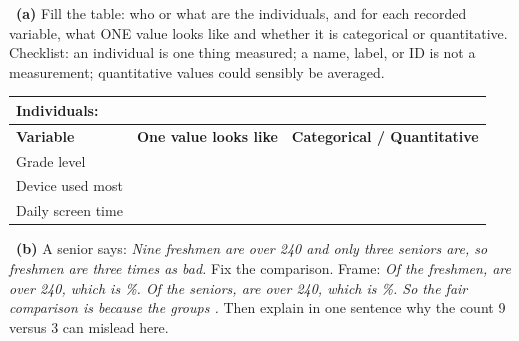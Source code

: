 \documentclass[11pt]{article}
\begin{document}
~\textbf{(a)} Fill the table: who or what are the individuals, and for each recorded variable, what ONE value looks like and whether it is categorical or quantitative. Checklist: an individual is one thing measured; a name, label, or ID is not a measurement; quantitative values could sensibly be averaged.\par\smallskip \begin{tabular}{|p{1.3in}|p{2.2in}|p{1.6in}|}\hline \textbf{Individuals:} & \multicolumn{2}{l|}{\hrulefill} \\ \hline \textbf{Variable} & \textbf{One value looks like} & \textbf{Categorical / Quantitative} \\ \hline Grade level & & \\[10pt] \hline Device used most & & \\[10pt] \hline Daily screen time & & \\[10pt] \hline \end{tabular}\par
{}

~\textbf{(b)} A senior says: \emph{Nine freshmen are over 240 and only three seniors are, so freshmen are three times as bad.} Fix the comparison. Frame: \emph{Of the \underline{\hspace{0.4in}} freshmen, \underline{\hspace{0.4in}} are over 240, which is \underline{\hspace{0.4in}}\%. Of the \underline{\hspace{0.4in}} seniors, \underline{\hspace{0.4in}} are over 240, which is \underline{\hspace{0.4in}}\%. So the fair comparison is \underline{\hspace{0.9in}} because the groups \underline{\hspace{0.9in}}.} Then explain in one sentence why the count 9 versus 3 can mislead here.\par
{}
\end{document}
